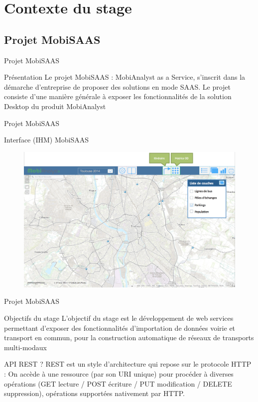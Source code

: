 \documentclass[utf8,compress]{beamer}
\begin{document}
\section{Contexte du stage}
\subsection{Projet MobiSAAS}
\begin{frame}{Projet MobiSAAS}
\begin{block}{Présentation}
Le projet \og MobiSAAS \fg : MobiAnalyst as a Service, s'inscrit dans la démarche d'entreprise de proposer des solutions en mode SAAS. Le projet consiste d'une manière générale à exposer les fonctionnalités de la solution Desktop du produit \og MobiAnalyst \fg
\end{block}
\end{frame}
\begin{frame}{Projet MobiSAAS}
\begin{block}{Interface (IHM) MobiSAAS}
\begin{figure}[h]
    \center
    \includegraphics[width=\textwidth]{images/MobiSAAS_IHM.png}
\end{figure}
\end{block}
\end{frame}
\begin{frame}{Projet MobiSAAS}
\begin{block}{Objectifs du stage}
L'objectif du stage est le développement de web services permettant d'exposer des fonctionnalités d'importation de données voirie et transport en commun, pour la construction automatique de réseaux de transports multi-modaux
\end{block}
\begin{block}{API REST ?}
REST est un style d'architecture qui repose sur le protocole HTTP : On accède à une ressource (par son URI unique) pour procéder à diverses opérations (GET lecture / POST écriture / PUT modification / DELETE suppression), opérations supportées nativement par HTTP.
\end{block}
\end{frame}
\end{document}
